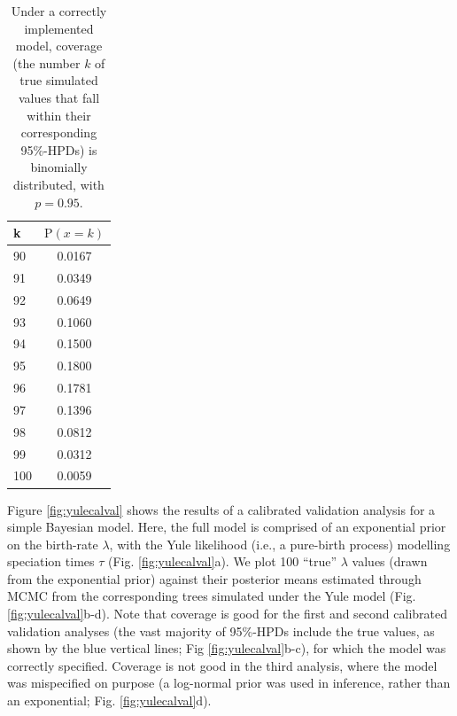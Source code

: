 \documentclass[oneside]{article}
\begin{document}
\begin{table}
\begin{center}
\begin{tabular}{lc}
\hline
k & $\text{P}(x=k)$ \\ %
\hline
90 & 0.0167 \\ %
91 & 0.0349 \\ %
92 & 0.0649 \\ %
93 & 0.1060 \\ %
94 & 0.1500 \\ %
95 & 0.1800 \\ %
96 & 0.1781 \\ %
97 & 0.1396 \\ %
98 & 0.0812 \\ %
99 & 0.0312 \\ %
100 & 0.0059 \\ %
\hline
\end{tabular}
\end{center}
\caption{Under a correctly implemented model, coverage (the number $k$
  of true simulated values that fall within their corresponding 95\%-HPDs) is binomially
  distributed, with $p=0.95$. 
\label{tab:coverage}}
\end{table}

Figure \ref{fig:yulecalval} shows the results of a calibrated
validation analysis for a simple Bayesian model.
Here, the full model is comprised of an exponential prior on the birth-rate
$\lambda$, with the Yule likelihood (i.e., a pure-birth process)
modelling speciation times $\tau$ (Fig. \ref{fig:yulecalval}a).
We plot 100 ``true'' $\lambda$ values (drawn from the exponential prior)
against their posterior means estimated through MCMC from the
corresponding trees simulated under the Yule model
(Fig. \ref{fig:yulecalval}b-d).
Note that coverage is good for the first and second calibrated
validation analyses (the vast majority of 95\%-HPDs
include the true values, as shown by the blue vertical lines; Fig
\ref{fig:yulecalval}b-c), for which the model was correctly
specified.
Coverage is not good in the third analysis, where the model was
mispecified on purpose (a log-normal prior was used in inference,
rather than an exponential; Fig. \ref{fig:yulecalval}d).
\end{document}
